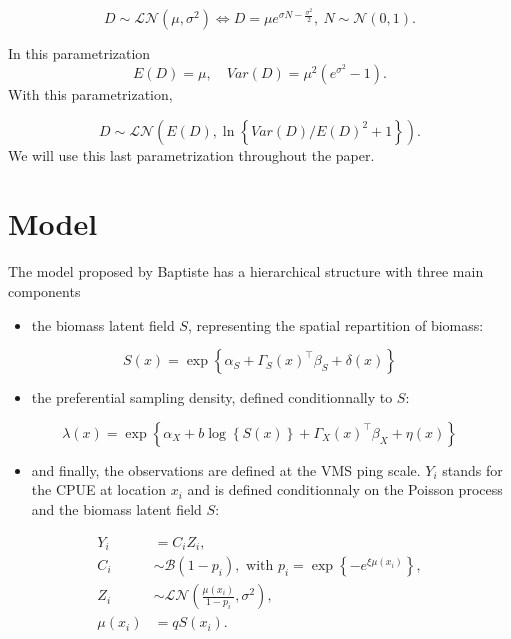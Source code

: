 \documentclass[
]{book}
\providecommand{\tightlist}{%
  \setlength{\itemsep}{0pt}\setlength{\parskip}{0pt}}
\begin{document}
\begin{equation} 
  D \sim \mathcal{LN} (\mu, \sigma^2) \Longleftrightarrow D =\mu e^{\sigma N- \frac{\sigma^2}{2}}, \ N\sim \mathcal{N}(0,1) .
  \label{eq:LNv3}
\end{equation}

In this parametrization
\[E(D) = \mu ,\quad Var(D) = \mu^2 \left(e^{\sigma^2}-1\right). \]
With this parametrization,

\[D \sim\mathcal{LN}\left ( E(D), \ln\left\lbrace Var(D)/E(D)^2 +1\right\rbrace\right ).\]
We will use this last parametrization throughout the paper.

\hypertarget{model}{%
\section{Model}\label{model}}

The model proposed by Baptiste has a hierarchical structure with three main components

\begin{itemize}
\tightlist
\item
  the biomass latent field \(S\), representing the spatial repartition of biomass:
\end{itemize}

\begin{equation} 
  S(x)  = \exp{ \left \lbrace \alpha_S + \Gamma_S(x)^\intercal \beta_S +\delta(x)\right \rbrace}
  \label{eq:latent}
\end{equation}

\begin{itemize}
\tightlist
\item
  the preferential sampling density, defined conditionnally to \(S\):
\end{itemize}

\begin{equation} 
  \lambda(x)  = \exp{ \left \lbrace \alpha_X + b \log{\left \lbrace S(x)\right\rbrace} + \Gamma_X(x)^\intercal \beta_X +\eta(x)\right \rbrace}
  \label{eq:pref}
\end{equation}

\begin{itemize}
\tightlist
\item
  and finally, the observations are defined at the VMS ping scale. \(Y_i\) stands for the CPUE at location \(x_i\) and is defined conditionnaly on the Poisson process and the biomass latent field \(S\):
\end{itemize}

\begin{align*} 
  Y_i  &= C_i Z_i,    \label{eq:obs}\\ 
  C_i &\sim \mathcal{B}(1-p_i), \mbox{ with } p_i = \exp{ \left \lbrace  - e^{\xi \mu(x_i) }\right \rbrace}, \nonumber  \\
  Z_i &\sim \mathcal{LN}( \frac{\mu(x_i)}{1-p_i}, \sigma^2),\nonumber \\
  \mu(x_i) &= q S(x_i).\nonumber \\
\end{align*}
\end{document}
